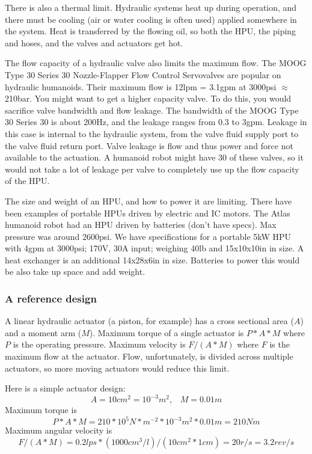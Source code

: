 \documentclass[letterpaper,12pt,fullpage]{article}
\begin{document}
There is also a thermal limit. Hydraulic systems heat up during operation,
and there must be cooling (air or water cooling is often used)
applied somewhere in the system. Heat is transferred by the flowing oil,
so both the HPU, the piping and hoses, and the valves and actuators get hot.

The flow capacity of a hydraulic valve also limits the maximum flow.
The MOOG Type 30 Series 30 Nozzle-Flapper Flow Control Servovalves
are popular on hydraulic humanoids. Their maximum flow is
12lpm = 3.1gpm at 3000psi $\approx$ 210bar.
You might want to get a higher capacity valve. To do this, you
would sacrifice valve bandwidth and flow leakage.
The bandwidth of the MOOG Type 30
Series 30 is about 200Hz, and the leakage ranges from
0.3 to 3gpm. Leakage in this case is internal to the hydraulic
system, from the valve fluid supply port to the valve fluid return port.
Valve leakage is flow and thus power and force
not available to the actuation.
A humanoid robot might have 30 of these valves,
so it would not take a lot of leakage per valve to completely
use up the flow capacity of the HPU.

The size and weight of an HPU, and how to power it are limiting.
There have been examples of portable HPUs driven by electric and IC motors.
The Atlas humanoid
robot had an HPU driven by batteries (don't have specs).
Max pressure was around 2600psi.
We have specifications for a portable 
5kW HPU with 4gpm at 3000psi; 170V, 30A input; weighing
40lb and 15x10x10in in size.
A heat exchanger is an additional 14x28x6in in size.
Batteries to power this would be also take up space and 
add weight.

\subsubsection{A reference design}

A linear hydraulic actuator (a piston, for example) has a cross sectional
area ($A$) and a moment arm ($M$). Maximum torque of a single actuator
is $P*A*M$ where $P$ is the operating pressure.
Maximum velocity is $F/(A*M)$ where $F$ is the maximum flow at the
actuator.
Flow, unfortunately, is divided across multiple actuators,
so more moving actuators would reduce this limit.

Here is a simple actuator design:
\begin{equation}
A = 10cm^2 = 10^{-3}m^2, \; \; \; M = 0.01m
\end{equation}
Maximum torque is
\begin{equation}
P*A*M = 210*10^5N*m^{-2}*10^{-3}m^2*0.01m = 210Nm 
\end{equation}
Maximum angular velocity is
\begin{equation}
F/(A*M) = 0.2lps*(1000cm^3/l)/(10cm^2*1cm) = 20r/s = 3.2rev/s
\end{equation}
\end{document}
